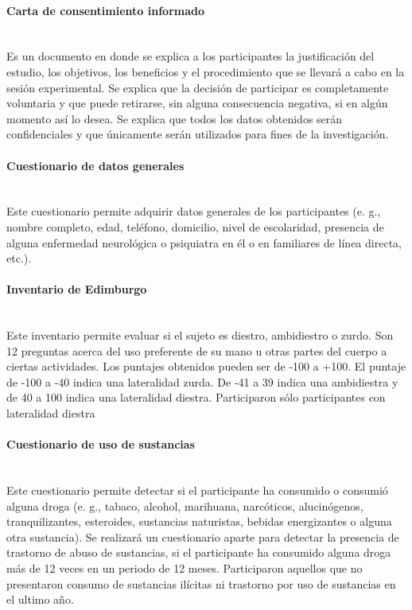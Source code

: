 \documentclass[12pt,letterpaper,final]{article}
\let\cite\cite %
\begin{document}
\paragraph{Carta de consentimiento informado} \mbox{}\\
Es un documento en donde se explica a los participantes la justificación del estudio, los objetivos, los beneficios y el procedimiento que se llevará a cabo en la sesión experimental. Se explica  que la decisión de participar es completamente voluntaria y que puede retirarse, sin alguna consecuencia negativa, si en algún momento así lo desea. Se explica que todos los datos obtenidos serán confidenciales y que únicamente serán utilizados para fines de la investigación. %

\paragraph{Cuestionario de datos generales} \mbox{}\\
Este cuestionario permite adquirir datos generales de los participantes (e. g., nombre completo, edad, teléfono, domicilio, nivel de escolaridad, presencia de alguna enfermedad neurológica o psiquiatra en él o en familiares de línea directa, etc.).

\paragraph[Inventario de Edimburgo]{Inventario de Edimburgo \cite{Oldfield1971}} \mbox{}\\
Este inventario permite evaluar si el sujeto es diestro, ambidiestro o zurdo. Son 12 preguntas acerca del uso preferente de su mano u otras partes del cuerpo a ciertas actividades. Los puntajes obtenidos pueden ser de -100 a +100. El puntaje de -100 a -40 indica una lateralidad zurda. De -41 a 39 indica una ambidiestra y de 40 a 100 indica una lateralidad diestra. Participaron sólo participantes con lateralidad diestra

\paragraph{Cuestionario de uso de sustancias} \mbox{}\\
Este cuestionario permite detectar si el participante ha consumido o consumió alguna droga (e. g., tabaco, alcohol, marihuana, narcóticos, alucinógenos, tranquilizantes, esteroides, sustancias naturistas, bebidas energizantes o alguna otra sustancia). Se realizará un cuestionario aparte para detectar la presencia de trastorno de abuso de sustancias, si el participante ha consumido alguna droga más de 12 veces en un periodo de 12 meses. Participaron aquellos que no presentaron consumo de sustancias ilícitas ni trastorno por uso de sustancias en el ultimo año. %
\end{document}
